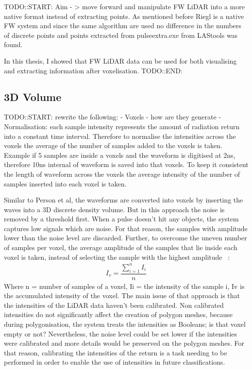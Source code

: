 \documentclass{subfiles}
\begin{document}
TODO::START:\newline
Aim - > move forward and manipulate FW LiDAR into a more native format instead of extracting points. As mentioned before Riegl is a native FW system and since the same algorithm are used no difference in the numbers of discrete points and points extracted from pulseextra.exe from LAStools was found.

In this thesis, I showed that FW LiDAR data can be used for both visualising and extracting information after voxelisation. 
TODO::END:\newline

\subsection{3D Volume}
TODO::START:\newline
rewrite the following:
- Voxels - how are they generate
- Normalisation: each sample intensity represents the amount of radiation return into a constant time interval. Therefore to normalise the intensities across the voxels the average of the number of samples added to the voxels is taken. Example if 5 samples are inside a voxels and the waveform is digitised at 2ns, therefore 10ns internal of waveform is saved into that voxels. To keep it consistent the length of waveform across the voxels the average intensity of the number of samples inserted into each voxel is taken. 

Similar to Person et al, the waveforms are converted into voxels by inserting the waves into a 3D discrete density volume. But in this approach the noise is removed by a threshold first. When a pulse doesn’t hit any objects, the system captures low signals which are noise. For that reason, the samples with amplitude lower than the noise level are discarded. Further, to overcome the uneven number of samples per voxel, the average amplitude of the samples that lie inside each voxel is taken, instead of selecting the sample with the highest amplitude ~\cite{Persson2005}:
	\begin{eqnarray}
		I_{v} = \dfrac{\sum_{i=1}^{n}I_{i}}{n}
	\end{eqnarray} 
Where 	n = number of samples of a voxel, 
	Ii = the intensity of the sample i, 
	Iv is the accumulated intensity of the voxel.  
The main issue of that approach is that the intensities of the LiDAR data haven’t been calibrated. Non calibrated intensities do not significantly affect the creation of polygon meshes, because during polygonisation, the system treats the intensities as Booleans; is that voxel empty or not? Nevertheless, the noise level could be set lower if the intensities were calibrated and more details would be preserved on the polygon meshes. For that reason, calibrating the intensities of the return is a task needing to be performed in order to enable the use of intensities in future classifications. 
\end{document}
